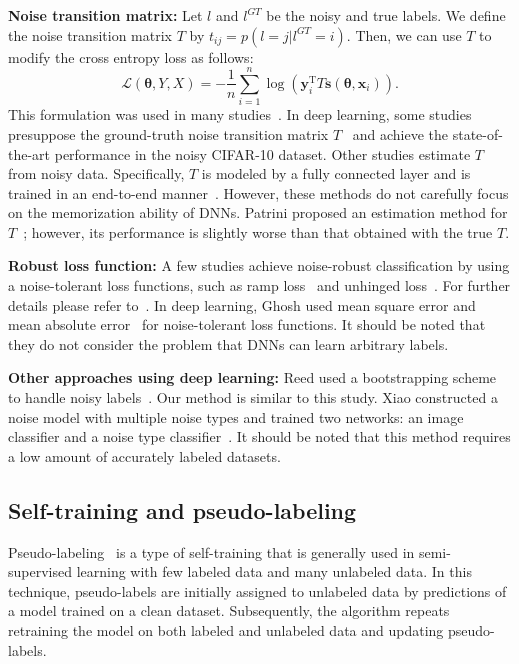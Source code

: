 \documentclass[10pt,twocolumn,letterpaper]{article}
\begin{document}
\vspace{2mm}\noindent\textbf{Noise transition matrix:}
Let $l$ and $l^{GT}$ be the noisy and true labels. We define the noise transition matrix $T$ by $t_{ij} = p(l=j|l^{GT}=i)$. Then, we can use $T$ to modify the cross entropy loss as follows:
\begin{equation}\label{eq:NoisematrixCE}
\mathcal{L}(\bm{\theta},Y,X) = -\frac{1}{n}\sum_{i=1}^n\log\left(\bm{y}_i^{\mathrm{T}}T\bm{s}(\bm{\theta},\bm{x}_i)\right).
\end{equation}
This formulation was used in many studies~\cite{sukhbaatar2014training,jindal2016learning,patrini2016making}.
In deep learning, some studies presuppose the ground-truth noise transition matrix $T$~\cite{patrini2016making,vahdat2017toward} and achieve the state-of-the-art performance in the noisy CIFAR-10 dataset. Other studies estimate $T$ from noisy data. Specifically, $T$ is modeled by a fully connected layer and is trained in an end-to-end manner~\cite{sukhbaatar2014training,jindal2016learning}.
However, these methods do not carefully focus on the memorization ability of DNNs. Patrini \etal proposed an estimation method for $T$~\cite{patrini2016making}; however, its performance is slightly worse than that obtained with the true $T$.

\vspace{2mm}\noindent\textbf{Robust loss function:}
A few studies achieve noise-robust classification by using a noise-tolerant loss functions, such as ramp loss~\cite{brooks2011support} and unhinged loss~\cite{van2015learning}. For further details please refer to~\cite{ghosh2015making}. In deep learning, Ghosh \etal used mean square error and mean absolute error~\cite{ghosh2017robust} for noise-tolerant loss functions. It should be noted that they do not consider the problem that DNNs can learn arbitrary labels.

\vspace{2mm}\noindent\textbf{Other approaches using deep learning:}
Reed \etal used a bootstrapping scheme to handle noisy labels~\cite{reed2014training}. Our method is similar to this study.
Xiao \etal constructed a noise model with multiple noise types and trained two networks: an image classifier and a noise type classifier~\cite{xiao2015learning}. It should be noted that this method requires a low amount of accurately labeled datasets.

\subsection{Self-training and pseudo-labeling}
Pseudo-labeling~\cite{zhu2006semi,haffari2012analysis,lee2013pseudo} is a type of self-training that is generally used in semi-supervised learning with few labeled data and many unlabeled data. In this technique, pseudo-labels are initially assigned to unlabeled data by predictions of a model trained on a clean dataset. Subsequently, the algorithm repeats retraining the model on both labeled and unlabeled data and updating pseudo-labels.
\end{document}
